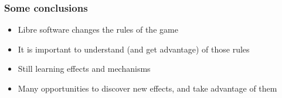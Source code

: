 \documentclass{beamer}
\begin{document}

\begin{frame}
\frametitle{Some conclusions}

\begin{itemize}
\item Libre software changes the rules of the game
\item It is important to understand (and get advantage) of those rules
\item Still learning effects and mechanisms
\item Many opportunities to discover new effects, and take advantage of them
\end{itemize}
\end{frame}
\end{document}
